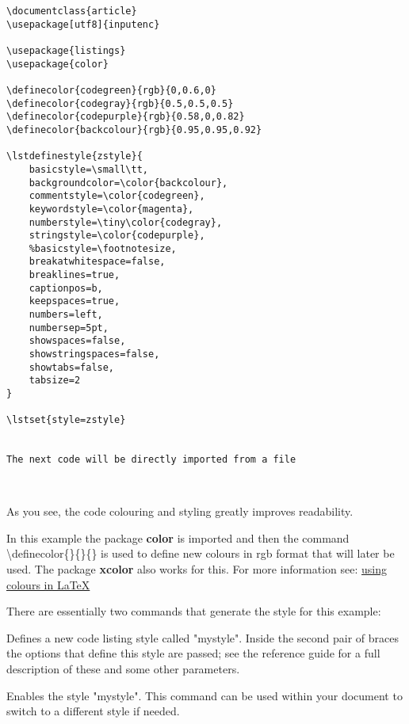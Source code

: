 \begin{lstlisting}[language={[LaTeX]TeX}, caption=Code styles and colours]
\documentclass{article}
\usepackage[utf8]{inputenc}

\usepackage{listings}
\usepackage{color}

\definecolor{codegreen}{rgb}{0,0.6,0}
\definecolor{codegray}{rgb}{0.5,0.5,0.5}
\definecolor{codepurple}{rgb}{0.58,0,0.82}
\definecolor{backcolour}{rgb}{0.95,0.95,0.92}

\lstdefinestyle{zstyle}{
	basicstyle=\small\tt,
	backgroundcolor=\color{backcolour},   
	commentstyle=\color{codegreen},
	keywordstyle=\color{magenta},
	numberstyle=\tiny\color{codegray},
	stringstyle=\color{codepurple},
	%basicstyle=\footnotesize,
	breakatwhitespace=false,         
	breaklines=true,                 
	captionpos=b,                    
	keepspaces=true,                 
	numbers=left,                    
	numbersep=5pt,                  
	showspaces=false,                
	showstringspaces=false,
	showtabs=false,                  
	tabsize=2
}

\lstset{style=zstyle}


The next code will be directly imported from a file



\end{lstlisting}

As you see, the code colouring and styling greatly improves readability.

In this example the package \textbf{color} is imported and then the command \textbackslash definecolor\{\}\{\}\{\} is used to define new colours in rgb format that will later be used. The package \textbf{xcolor} also works for this. For more information see: \underline{using colours in \LaTeX}

There are essentially two commands that generate the style for this example:


Defines a new code listing style called "mystyle". Inside the second pair of braces the options that define this style are passed; see the reference guide for a full description of these and some other parameters.


Enables the style "mystyle". This command can be used within your document to switch to a different style if needed.


